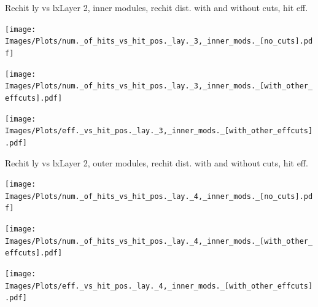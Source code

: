 \documentclass{beamer}
\begin{document}
\begin{frame}{Rechit ly vs lx}{Layer 2, inner modules, rechit dist. with and without cuts, hit eff.}
  \begin{minipage}{0.32\textwidth}
    \centering
    \texttt{[image: Images/Plots/num.\_of\_hits\_vs\_hit\_pos.\_lay.\_3,\_inner\_mods.\_[no\_cuts].pdf]}
  \end{minipage}%
  \begin{minipage}{0.32\textwidth}
    \centering
    \texttt{[image: Images/Plots/num.\_of\_hits\_vs\_hit\_pos.\_lay.\_3,\_inner\_mods.\_[with\_other\_effcuts].pdf]}
  \end{minipage}%
  \begin{minipage}{0.32\textwidth}
    \centering
    \texttt{[image: Images/Plots/eff.\_vs\_hit\_pos.\_lay.\_3,\_inner\_mods.\_[with\_other\_effcuts].pdf]}
  \end{minipage}
\end{frame}

\begin{frame}{Rechit ly vs lx}{Layer 2, outer modules, rechit dist. with and without cuts, hit eff.}
  \begin{minipage}{0.32\textwidth}
    \centering
    \texttt{[image: Images/Plots/num.\_of\_hits\_vs\_hit\_pos.\_lay.\_4,\_inner\_mods.\_[no\_cuts].pdf]}
  \end{minipage}%
  \begin{minipage}{0.32\textwidth}
    \centering
    \texttt{[image: Images/Plots/num.\_of\_hits\_vs\_hit\_pos.\_lay.\_4,\_inner\_mods.\_[with\_other\_effcuts].pdf]}
  \end{minipage}%
  \begin{minipage}{0.32\textwidth}
    \centering
    \texttt{[image: Images/Plots/eff.\_vs\_hit\_pos.\_lay.\_4,\_inner\_mods.\_[with\_other\_effcuts].pdf]}
  \end{minipage}
\end{frame}
\end{document}
